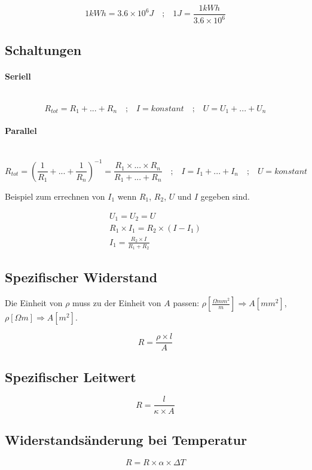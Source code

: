 \documentclass[a4paper,10pt]{article}
\newcommand{\lbparagraph}[1]{\paragraph{#1}\mbox{}\\}
\newcommand{\eqsp}[1]{\quad\textbf{;}\quad}
\begin{document}
\begin{equation}
    1kWh = 3.6 \times 10^6J
    \eqsp{}
    1J = \frac{1kWh}{3.6 \times 10^6}
\end{equation}

\subsection{Schaltungen}

\lbparagraph{Seriell}

\begin{equation}
    R_{tot} = R_1 + ... + R_n
    \eqsp{}
    I = konstant
    \eqsp{}
    U = U_1 + ... + U_n
\end{equation}

\lbparagraph{Parallel}

\begin{equation}
    R_{tot} = (\frac{1}{R_1} + ... + \frac{1}{R_n})^{-1} = \frac{R_1 \times ... \times R_n}{R_1 + ... + R_n}
    \eqsp{}
    I = I_1 + ... + I_n
    \eqsp{}
    U = konstant
\end{equation}

Beispiel zum errechnen von $I_1$ wenn $R_1$, $R_2$, $U$ und $I$ gegeben sind.

\begin{gather}
    U_1 = U_2 = U \\
    R_1 \times I_1 = R_2 \times (I - I_1) \\
    I_1 = \frac{R_2 \times I}{R_1 + R_2}
\end{gather}

\subsection{Spezifischer Widerstand}
Die Einheit von $\rho$ muss zu der Einheit von $A$ passen: $\rho[\frac{{\Omega}mm^2}{m}] \Rightarrow A[mm^2]$, $\rho[{\Omega}m] \Rightarrow A[m^2]$.

\begin{equation}
    R = \frac{\rho \times l}{A}
\end{equation}

\subsection{Spezifischer Leitwert}

\begin{equation}
    R = \frac{l}{\kappa \times A}
\end{equation}

\subsection{Widerstandsänderung bei Temperatur}

\begin{equation}
    R = R \times \alpha \times {\Delta}T
\end{equation}
\end{document}
